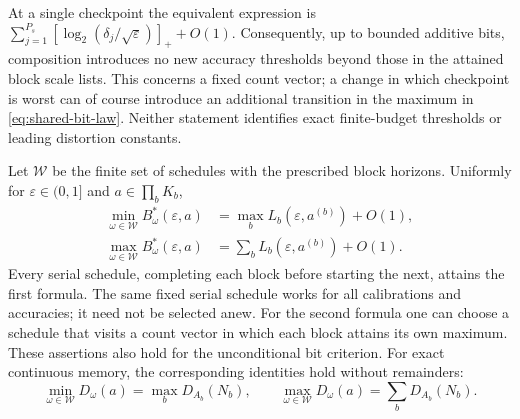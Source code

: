 At a single checkpoint the equivalent expression is
$\sum_{j=1}^{P_s}[\log_2(\delta_j/\sqrt\varepsilon)]_++O(1)$.
Consequently, up to bounded additive bits, composition introduces no
new accuracy thresholds beyond those in the attained block scale lists.
This concerns a fixed count vector; a change in which checkpoint is
worst can of course introduce an additional transition in the maximum
in \eqref{eq:shared-bit-law}. Neither statement identifies exact
finite-budget thresholds or leading distortion constants.

\begin{theorem}\label{thm:schedule-extrema}
Let $\mathcal W$ be the finite set of schedules with the prescribed
block horizons. Uniformly for $\varepsilon\in(0,1]$ and
$a\in\prod_bK_b$,
\begin{equation}\label{eq:schedule-extrema}
 \begin{split}
 \min_{\omega\in\mathcal W} B_\omega^*(\varepsilon,a)
      &=\max_b L_b(\varepsilon,a^{(b)})+O(1),\\
 \max_{\omega\in\mathcal W} B_\omega^*(\varepsilon,a)
      &=\sum_b L_b(\varepsilon,a^{(b)})+O(1).
 \end{split}
\end{equation}
Every serial schedule, completing each block before starting the next,
attains the first formula. The same fixed serial schedule works for all
calibrations and accuracies; it need not be selected anew. For the second
formula one can choose a schedule that visits a count vector in which
each block attains its own maximum. These assertions also hold for the
unconditional bit criterion. For exact continuous memory, the corresponding
identities hold without remainders:
\begin{equation}\label{eq:exact-schedule-extrema}
 \min_{\omega\in\mathcal W}D_\omega(a)=\max_bD_{A_b}(N_b),
 \qquad
 \max_{\omega\in\mathcal W}D_\omega(a)=\sum_bD_{A_b}(N_b).
\end{equation}
\end{theorem}
